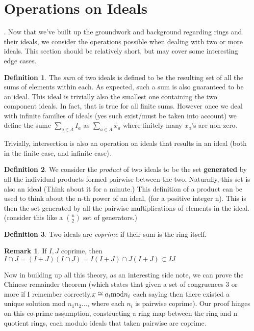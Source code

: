 \documentclass[12pt]{book}
\theoremstyle{definition}
\newtheorem*{definition}{Definition}
\newtheorem*{remark}{Remark}
\begin{document}
\section{Operations on Ideals}.
Now that we've built up the groundwork and background regarding rings and their ideals, we consider the operations possible when dealing with two or more ideals. 
This section should be relatively short, but may cover some interesting edge cases.
\begin{definition}
    The \textit{sum} of two ideals is defined to be the resulting set of all the sums of elements within each. As expected, such a sum is also guaranteed to be an ideal. This ideal is trivially also the smallest one containing the two component ideals. In fact, that is true for all finite sums. However once we deal with infinite families of ideals (yes such exist/must be taken into account) we define the sume $\sum_{a \in A} I_a$ as $\sum_{a \in A} x_a$ where finitely many $x_a$'s are non-zero.
\end{definition}
Trivially, intersection is also an operation on ideals that results in an ideal (both in the finite case, and infinite case).
\begin{definition}
    We consider the \textit{product} of two ideals to be the set \textbf{generated} by all the individual products formed pairwise between the two. Naturally, this set is also an ideal (Think about it for a minute.) This definition of a product can be used to think about the n-th power of an ideal, (for a positive integer n). This is then the set generated by all the pairwise multiplications of elements in the ideal. (consider this like a $\binom{n}{2}$ set of generators.) 
\end{definition}
\begin{definition}
    Two ideals are \textit{coprime} if their sum is the ring itself.
\end{definition}
\begin{remark}
    If $I, J$ coprime, then $I \cap J = (I + J)(I \cap J) = I(I + J) \cap J(I + J) \subset IJ$
\end{remark}
Now in building up all this theory, as an interesting side note, we can prove the Chinese remainder theorem (which states that given a set of congruences 3 or more if I remember correctly,$x \cong a_i \textnormal{mod} n_i $ each saying  then there existed a unique solution mod $n_1n_2\ldots$, where each $n_i$ is pairwise coprime). Our proof hinges on this co-prime assumption, constructing a ring map between the ring and n quotient rings, each modulo ideals that taken pairwise are coprime. \\
\end{document}
